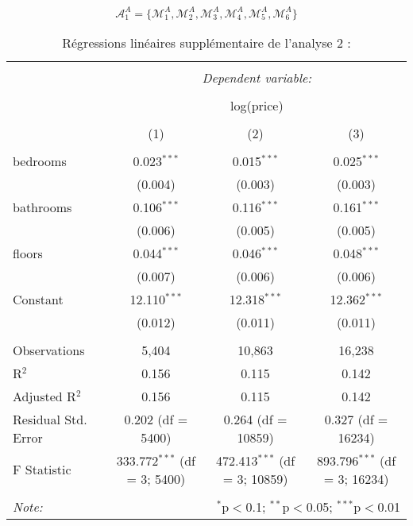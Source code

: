 \documentclass[
  11pt,
  french,
]{article}
\begin{document}
\newpage

\[\mathcal{A}_{1}^{A}=\{\mathcal{M}_{1}^{A},\mathcal{M}_{2}^{A},\mathcal{M}_{3}^{A},\mathcal{M}_{4}^{A},\mathcal{M}_{5}^{A},\mathcal{M}_{6}^{A}\}\]

\begin{table}[!htbp] \centering 
  \caption{Régressions linéaires supplémentaire de l'analyse 2 :} 
  \label{} 
\small 
\begin{tabular}{@{\extracolsep{1pt}}lccc} 
\\[-1.8ex]\hline 
\hline \\[-1.8ex] 
 & \multicolumn{3}{c}{\textit{Dependent variable:}} \\ 
\cline{2-4} 
\\[-1.8ex] & \multicolumn{3}{c}{log(price)} \\ 
\\[-1.8ex] & (1) & (2) & (3)\\ 
\hline \\[-1.8ex] 
 bedrooms & 0.023$^{***}$ & 0.015$^{***}$ & 0.025$^{***}$ \\ 
  & (0.004) & (0.003) & (0.003) \\ 
  bathrooms & 0.106$^{***}$ & 0.116$^{***}$ & 0.161$^{***}$ \\ 
  & (0.006) & (0.005) & (0.005) \\ 
  floors & 0.044$^{***}$ & 0.046$^{***}$ & 0.048$^{***}$ \\ 
  & (0.007) & (0.006) & (0.006) \\ 
  Constant & 12.110$^{***}$ & 12.318$^{***}$ & 12.362$^{***}$ \\ 
  & (0.012) & (0.011) & (0.011) \\ 
 \hline \\[-1.8ex] 
Observations & 5,404 & 10,863 & 16,238 \\ 
R$^{2}$ & 0.156 & 0.115 & 0.142 \\ 
Adjusted R$^{2}$ & 0.156 & 0.115 & 0.142 \\ 
Residual Std. Error & 0.202 (df = 5400) & 0.264 (df = 10859) & 0.327 (df = 16234) \\ 
F Statistic & 333.772$^{***}$ (df = 3; 5400) & 472.413$^{***}$ (df = 3; 10859) & 893.796$^{***}$ (df = 3; 16234) \\ 
\hline 
\hline \\[-1.8ex] 
\textit{Note:}  & \multicolumn{3}{r}{$^{*}$p$<$0.1; $^{**}$p$<$0.05; $^{***}$p$<$0.01} \\ 
\end{tabular} 
\end{table}
\end{document}
